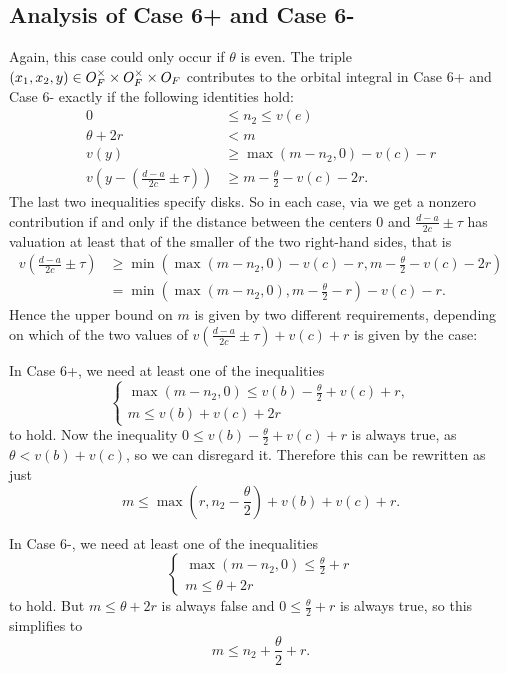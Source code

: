 \subsection{Analysis of Case 6\ts+ and Case 6\ts-}
Again, this case could only occur if $\theta$ is even.
The triple $(x_1, x_2, y) \in O_F^\times \times O_F^\times \times O_F$
contributes to the orbital integral in Case 6\ts+ and Case 6\ts-
exactly if the following identities hold:
\begin{align*}
  0 &\le n_2 \le v(e) \\
  \theta + 2r &< m \\
  v(y) &\ge \max(m-n_2,0) - v(c) - r \\
  v\left( y - \left( \frac{d-a}{2c} \pm \tau \right) \right) &\ge m - \frac{\theta}{2} - v(c) - 2r.
\end{align*}
The last two inequalities specify disks.
So in each case, via 
we get a nonzero contribution if and only if the distance between the centers
$0$ and $\frac{d-a}{2c} \pm \tau$ has valuation at least
that of the smaller of the two right-hand sides, that is
\begin{align*}
  v\left( \frac{d-a}{2c} \pm \tau \right)
  &\ge \min\left( \max(m-n_2,0) - v(c) - r, m - \frac{\theta}{2} - v(c) - 2r \right) \\
  &= \min\left( \max(m-n_2,0), m - \frac{\theta}{2} - r \right) - v(c) - r.
\end{align*}
Hence the upper bound on $m$ is given by two different requirements,
depending on which of the two values of
$v\left( \frac{d-a}{2c} \pm \tau \right) + v(c) + r$ is given by the case:
\begin{itemize}
  \ii In Case 6\ts+, we need at least one of the inequalities
  \[
    \begin{cases}
    \max(m-n_2, 0) \le v(b) - \frac{\theta}{2} + v(c) + r, \\
    m \le v(b) + v(c) + 2r
    \end{cases}
  \]
  to hold.
  Now the inequality $0 \le v(b) - \frac{\theta}{2} + v(c) + r$ is always true,
  as $\theta < v(b) + v(c)$, so we can disregard it.
  Therefore this can be rewritten as just
  \[ m \le \max\left( r, n_2 - \frac{\theta}{2} \right) + v(b) + v(c) + r. \]

  \ii In Case 6\ts-, we need at least one of the inequalities
  \[
    \begin{cases}
      \max(m-n_2, 0) \le \frac{\theta}{2} + r \\
      m \le \theta + 2r
    \end{cases}
  \]
  to hold.
  But $m \le \theta+2r$ is always false and $0 \le \frac{\theta}{2} + r$ is always true,
  so this simplifies to
  \[ m \le n_2 + \frac{\theta}{2} + r. \]
\end{itemize}
